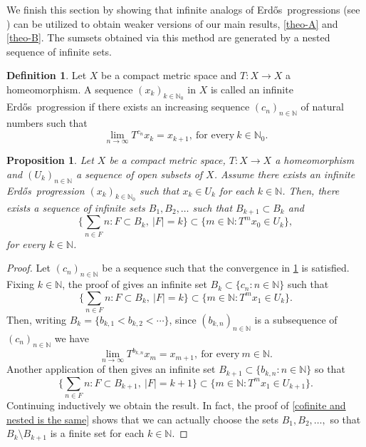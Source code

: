 \documentclass[letter, 11pt]{article}
\newcommand{\Erdos}{Erd\H{o}s}
\newtheorem{prop}[theo]{Proposition}
\theoremstyle{definition}
\newtheorem{defn}[theo]{Definition}
\theoremstyle{plain}
\newcommand{\N}{\mathbb{N}}
\newcommand{\1}{\mathbbm{1}}
\begin{document}
We finish this section by showing that infinite analogs of \Erdos\ 
progressions (see \cite[Definition 2.1]{kmrr25}) can be utilized 
to obtain weaker versions of our main results, \cref{theo-A} and 
\cref{theo-B}. The 
sumsets obtained via this method are generated by a nested sequence of infinite sets.

\begin{defn}\label{Infinite EP}
Let $X$ be a compact metric space and $T \colon X \to X$ a homeomorphism. A sequence $(x_k)_{k\in \N_0}$ in $X$ is 
called an infinite \Erdos\ progression if there exists an increasing sequence 
$(c_n)_{n\in \N}$ of natural numbers such that 
$$\lim_{n\to \infty}T^{c_n}x_{k}=x_{k+1},\ \text{for every}\ k\in \N_0.$$
\end{defn}

\begin{prop}\label{example appendix Erdos progressions}
Let $X$ be a compact metric space, $T \colon X \to X$ a homeomorphism and $(U_k)_{n\in \N}$ a sequence of open 
subsets of $X$. Assume there exists an infinite \Erdos\ progression 
$(x_k)_{k\in \N_0}$ such that $x_k\in U_k$ for each $k\in \N$. Then, there    exists a sequence of infinite sets $B_1,B_2,\ldots$ such that 
$B_{k+1} \subset B_k$ and
$$\Big\{ \sum_{n\in F}n \colon F\subset B_k,\ |F|=k\Big\} \subset \Big\{ m \in \N \colon T^mx_0\in U_k\Big\},$$
for every $k\in \N$. 
\end{prop}

\begin{proof}
Let $(c_n)_{n\in \N}$ be a sequence such that the convergence in \cref{Infinite EP} is satisfied. Fixing $k\in \N$, the proof of \cite[Lemma 2.2]{kmrr25} gives an infinite set $B_k \subset \{c_n: n\in \N\}$ such that 
$$\bigg\{ \sum_{n\in F}n : F\subset B_k,\ |F|=k\bigg\} \subset \bigg\{m \in \N \colon T^mx_1\in U_k\bigg\}.$$
Then, writing $B_k=\{b_{k,1}<b_{k,2}<\cdots\}$, since $(b_{k,n})_{n\in \N}$ is 
a subsequence of $(c_n)_{n\in \N}$ we have 
$$\lim_{n\to \infty}T^{b_{k,n}}x_{m}=x_{m+1},\ \text{for every}\ m\in \N.$$
Another application of \cite[Lemma 2.5]{kmrr25} then gives an infinite set $B_{k+1} \subset \{b_{k,n}:n\in \N\}$ so that 
$$\bigg\{ \sum_{n\in F}n : F\subset B_{k+1},\ |F|=k+1\bigg\} \subset \bigg\{m \in \N \colon T^mx_1\in U_{k+1}\bigg\}.$$
Continuing inductively we obtain the result. In fact, the proof 
of \cref{cofinite and nested is the same} shows that we can actually 
choose the sets $B_1,B_2,\ldots,$ so that $B_k\setminus B_{k+1}$ is a finite set 
for each $k\in \N$. 
\end{proof}
\end{document}
